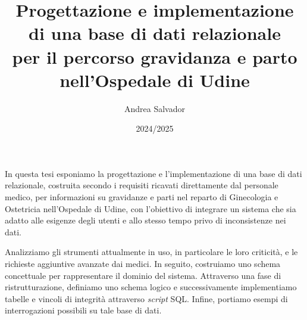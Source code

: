 \documentclass[target=bach,aauheader=,style=]{thud}
\title{Progettazione e implementazione
\\ di una base di dati relazionale
\\ per il percorso gravidanza e parto
\\ nell'Ospedale di Udine}
\author{Andrea Salvador}
\date{2024/2025}
\begin{document}
\maketitle




\abstract
In questa tesi esponiamo la progettazione e l'implementazione di una base di dati relazionale, costruita secondo i requisiti ricavati direttamente dal personale medico, per informazioni su gravidanze e parti nel reparto di Ginecologia e Ostetricia nell'Ospedale di Udine, con l'obiettivo di integrare un sistema che sia adatto alle esigenze degli utenti e allo stesso tempo privo di inconsistenze nei dati.

Analizziamo gli strumenti attualmente in uso, in particolare le loro criticità, e le richieste aggiuntive avanzate dai medici. In seguito, costruiamo uno schema concettuale per rappresentare il dominio del sistema. Attraverso una fase di ristrutturazione, definiamo uno schema logico e successivamente implementiamo tabelle e vincoli di integrità attraverso \emph{script} SQL. Infine, portiamo esempi di interrogazioni possibili su tale base di dati.

\tableofcontents



\mainmatter

\end{document}
